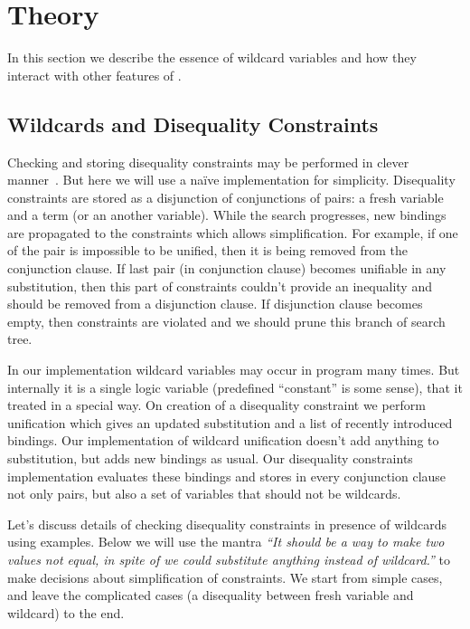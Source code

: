 
\section{Theory}
\label{sec:theory}

In this section we describe the essence of wildcard variables and how they interact with other features of \miniKanren{}.

\subsection{Wildcards and Disequality Constraints}
Checking and storing disequality constraints may be performed in clever manner~\cite{fasterMK}. But here we will use a na\"{i}ve implementation for simplicity. Disequality constraints are stored as a disjunction of conjunctions of pairs: a fresh variable and a term (or an another variable). While the search  progresses, new bindings are propagated to the constraints which allows simplification. For example, if one of the pair is impossible to be unified, then it is being removed from the conjunction clause. If last pair (in conjunction clause) becomes unifiable in any substitution, then this part of constraints couldn't provide an inequality and should be removed from a disjunction clause. If disjunction clause becomes empty, then constraints are violated and we should prune this branch of search tree. 

In our implementation wildcard variables may occur in program many times. But internally it is a single logic variable (predefined ``constant'' is some sense), that it treated in a special way. On creation of a disequality constraint we perform unification which gives an updated substitution and a list of recently introduced bindings. Our implementation of wildcard unification doesn't add anything to substitution, but adds new bindings as usual. Our disequality constraints implementation evaluates these bindings and stores in every conjunction clause not only pairs, but also a set of variables that should not be wildcards.

Let's discuss details of checking disequality constraints in presence of wildcards using examples. Below we will use the mantra \emph{``It should be a way to make two values not equal, in spite of we could substitute anything instead of wildcard.''} to make decisions about simplification of constraints. We start from simple cases, and leave the complicated cases (a disequality between fresh variable and wildcard) to the end. 

